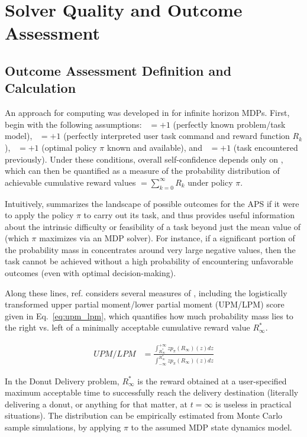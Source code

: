 \section{Solver Quality and Outcome Assessment}

\subsection{Outcome Assessment Definition and Calculation} \label{sec:xO}
An approach for computing \xO{} was developed in \cite{Aitken2016-cv} for infinite horizon MDPs. First, begin with the following assumptions: \xM~$=+1$ (perfectly known problem/task model), \xI~$= +1$ (perfectly interpreted user task command and reward function $R_k$), \xQ~$=+1$ (optimal policy $\pi$ known and available), and \xP~$=+1$ (task encountered previously). Under these conditions, overall self-confidence depends only on \xO{}, which can then be quantified as a measure of the probability distribution \ppiri of achievable cumulative reward values $ $\ri$= \sum_{k=0}^{\infty}R_{k}$ under policy $\pi$.

Intuitively, \ppiri summarizes the landscape of possible outcomes for the APS if it were to apply the policy $\pi$ to carry out its task, and thus provides useful information about the intrinsic difficulty or feasibility of a task beyond just the mean value of \ri{} (which $\pi$ maximizes via an MDP solver). For instance, if a significant portion of the probability mass in \ppiri concentrates around very large negative values, then the task cannot be achieved without a high probability of encountering unfavorable outcomes (even with optimal decision-making). 

Along these lines, ref. \cite{Aitken2016-cv} considers several measures of \ppiri, including the logistically transformed upper partial moment/lower partial moment (UPM/LPM) score given in Eq.~\ref{eq:upm_lpm}, which quantifies how much probability mass lies to the right vs. left of a minimally acceptable cumulative reward value $R^*_{\infty}$.

    \begin{align}
        UPM/LPM &= \frac{\int_{R^*_{\infty}}^{+\infty}zp_{\pi}(R_{\infty})(z)dz}{\int_{-\infty}^{R^*_{\infty}} zp_{\pi}(R_{\infty})(z)dz} \label{eq:upm_lpm}
    \end{align}

In the Donut Delivery problem, $R^*_{\infty}$ is the reward obtained at a user-specified maximum acceptable time to successfully reach the delivery destination (literally delivering a donut, or anything for that matter, at $t=\infty$ is useless in practical situations). The distribution \ppiri can be empirically estimated from Monte Carlo sample simulations, by applying $\pi$ to the assumed MDP state dynamics model.

